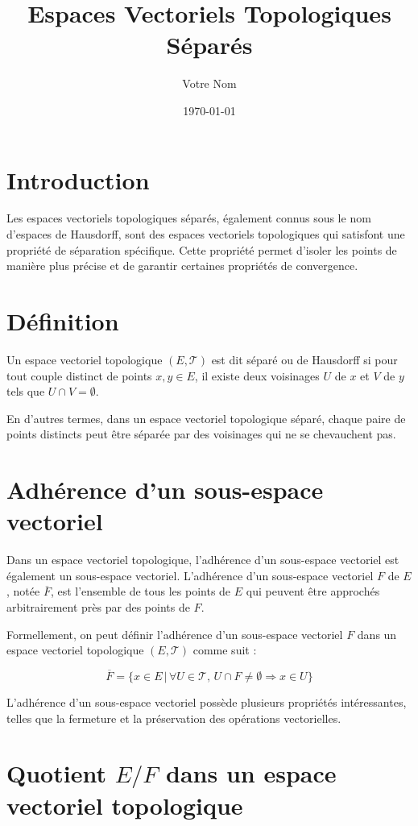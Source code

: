 \documentclass{article}
\title{Espaces Vectoriels Topologiques Séparés}
\author{Votre Nom}
\date{\today}
\begin{document}
\maketitle

\section{Introduction}

Les espaces vectoriels topologiques séparés, également connus sous le nom d'espaces de Hausdorff, sont des espaces vectoriels topologiques qui satisfont une propriété de séparation spécifique. Cette propriété permet d'isoler les points de manière plus précise et de garantir certaines propriétés de convergence.

\section{Définition}

Un espace vectoriel topologique $(E, \mathcal{T})$ est dit séparé ou de Hausdorff si pour tout couple distinct de points $x, y \in E$, il existe deux voisinages $U$ de $x$ et $V$ de $y$ tels que $U \cap V = \emptyset$.

En d'autres termes, dans un espace vectoriel topologique séparé, chaque paire de points distincts peut être séparée par des voisinages qui ne se chevauchent pas.

\section{Adhérence d'un sous-espace vectoriel}

Dans un espace vectoriel topologique, l'adhérence d'un sous-espace vectoriel est également un sous-espace vectoriel. L'adhérence d'un sous-espace vectoriel $F$ de $E$, notée $\overline{F}$, est l'ensemble de tous les points de $E$ qui peuvent être approchés arbitrairement près par des points de $F$.

Formellement, on peut définir l'adhérence d'un sous-espace vectoriel $F$ dans un espace vectoriel topologique $(E, \mathcal{T})$ comme suit :

\[
\overline{F} = \{x \in E \,|\, \forall U \in \mathcal{T}, \, U \cap F \neq \emptyset \Rightarrow x \in U\}
\]

L'adhérence d'un sous-espace vectoriel possède plusieurs propriétés intéressantes, telles que la fermeture et la préservation des opérations vectorielles.

\section{Quotient $E/F$ dans un espace vectoriel topologique}
\end{document}
